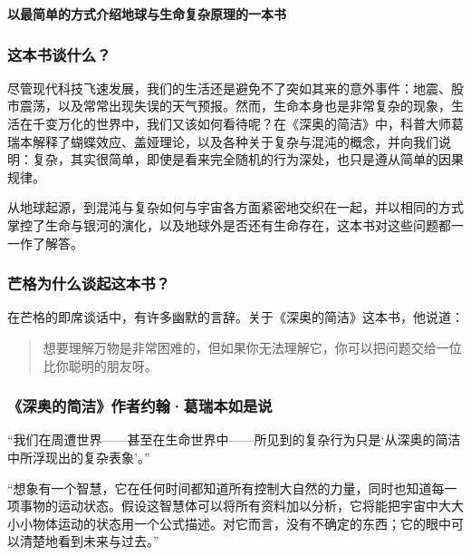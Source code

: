 \cleardoublepage
{}


\begin{BookSummaryBox}
\textbf{以最简单的方式介绍地球与生命复杂原理的一本书}
\par
\end{BookSummaryBox}

\subsubsection*{这本书谈什么？}

尽管现代科技飞速发展，我们的生活还是避免不了突如其来的意外事件：地震、股市震荡，以及常常出现失误的天气预报。然而，生命本身也是非常复杂的现象，生活在千变万化的世界中，我们又该如何看待呢？在《深奥的简洁》中，科普大师葛瑞本解释了蝴蝶效应、盖娅理论，以及各种关于复杂与混沌的概念，并向我们说明：复杂，其实很简单，即使是看来完全随机的行为深处，也只是遵从简单的因果规律。
\par

从地球起源，到混沌与复杂如何与宇宙各方面紧密地交织在一起，并以相同的方式掌控了生命与银河的演化，以及地球外是否还有生命存在，这本书对这些问题都一一作了解答。
\par

\subsubsection*{芒格为什么谈起这本书？}

在芒格的即席谈话中，有许多幽默的言辞。关于《深奥的简洁》这本书，他说道：
\par

\begin{quotation}
想要理解万物是非常困难的，但如果你无法理解它，你可以把问题交给一位比你聪明的朋友呀。
\par
\end{quotation}

\subsubsection*{《深奥的简洁》作者约翰·葛瑞本如是说}

“我们在周遭世界——甚至在生命世界中——所见到的复杂行为只是‘从深奥的简洁中所浮现出的复杂表象’。”
\par

“想象有一个智慧，它在任何时间都知道所有控制大自然的力量，同时也知道每一项事物的运动状态。假设这智慧体可以将所有资料加以分析，它将能把宇宙中大大小小物体运动的状态用一个公式描述。对它而言，没有不确定的东西；它的眼中可以清楚地看到未来与过去。”
\par
